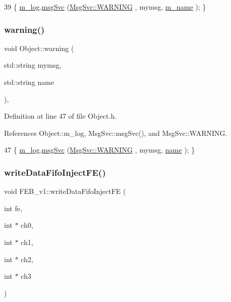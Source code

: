 \begin{DoxyCode}
39 \{ \hyperlink{classObject_a0d269813dd7ac1f24bc143031e2963f2}{m\_log}.\hyperlink{classMsgSvc_ad25f18047920cc59a314e5098259711c}{msgSvc} (\hyperlink{classMsgSvc_ae671eb7301996cd049d2da8a65925926a7cefae88f2ba26b2b05b676a383c834b}{MsgSvc::WARNING} , mymsg, \hyperlink{classObject_a8b83c95c705d2c3ba0d081fe1710f48d}{m\_name} ); \}
\end{DoxyCode}
\mbox{\label{classObject_a11f101db4dd73d9391b0231818881d86}} 
\subsubsection{\texorpdfstring{warning()}{warning()}\hspace{0.1cm}{\footnotesize\ttfamily [2/2]}}
{\footnotesize\ttfamily void Object\+::warning (\begin{DoxyParamCaption}\item[{std\+::string}]{mymsg,  }\item[{std\+::string}]{name }\end{DoxyParamCaption})\hspace{0.3cm}{\ttfamily [inline]}, {\ttfamily [inherited]}}



Definition at line 47 of file Object.\+h.



References Object\+::m\+\_\+log, Msg\+Svc\+::msg\+Svc(), and Msg\+Svc\+::\+W\+A\+R\+N\+I\+NG.


\begin{DoxyCode}
47 \{ \hyperlink{classObject_a0d269813dd7ac1f24bc143031e2963f2}{m\_log}.\hyperlink{classMsgSvc_ad25f18047920cc59a314e5098259711c}{msgSvc} (\hyperlink{classMsgSvc_ae671eb7301996cd049d2da8a65925926a7cefae88f2ba26b2b05b676a383c834b}{MsgSvc::WARNING} , mymsg, \hyperlink{classObject_a300f4c05dd468c7bb8b3c968868443c1}{name} ); \}
\end{DoxyCode}
\mbox{\label{classFEB__v1_a0afafcfdea15d3268284203a90c67572}} 
\subsubsection{\texorpdfstring{write\+Data\+Fifo\+Inject\+F\+E()}{writeDataFifoInjectFE()}}
{\footnotesize\ttfamily void F\+E\+B\+\_\+v1\+::write\+Data\+Fifo\+Inject\+FE (\begin{DoxyParamCaption}\item[{int}]{fe,  }\item[{int $\ast$}]{ch0,  }\item[{int $\ast$}]{ch1,  }\item[{int $\ast$}]{ch2,  }\item[{int $\ast$}]{ch3 }\end{DoxyParamCaption})}



